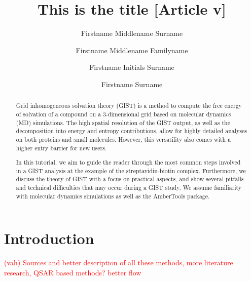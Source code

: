 \documentclass[9pt,tutorial]{livecoms}
\title{This is the title [Article v\versionnumber]}
\author[1*]{Firstname Middlename Surname}
\author[1,2\authfn{1}\authfn{3}]{Firstname Middlename Familyname}
\author[2\authfn{1}\authfn{4}]{Firstname Initials Surname}
\author[2*]{Firstname Surname}
\affil[1]{Institution 1}
\affil[2]{Institution 2}
\newcommand{\todo}{\textcolor{red}}
\begin{document}
\begin{frontmatter}
\maketitle

\begin{abstract}
Grid inhomogeneous solvation theory (GIST) is a method to compute the free energy of solvation of a compound on a 3-dimensional grid based on molecular dynamics (MD) simulations.
The high spatial resolution of the GIST output, as well as the decomposition into energy and entropy contributions, allow for highly detailed analyses on both proteins and small molecules. However, this versatility also comes with a higher entry barrier for new users.

In this tutorial, we aim to guide the reader through the most common steps involved in a GIST analysis at the example of the streptavidin-biotin complex.
Furthermore, we discuss the theory of GIST with a focus on practical aspects, and show several pitfalls and technical difficulties that may occur during a GIST study.
We assume familiarity with molecular dynamics simulations as well as the AmberTools package.

%
\end{abstract}

\end{frontmatter}




\section{Introduction}
\todo{ (vah) Sources and better description of all these methods, more literature research, QSAR based methods? better flow }
\end{document}
